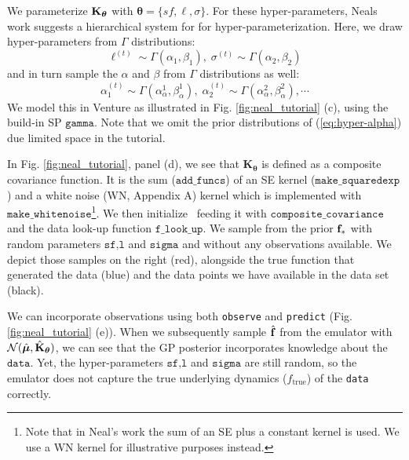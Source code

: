 We parameterize $\mathbf{K}_{\bm{\theta}}$ with $\bm{\theta}=\{sf,\ell,\sigma\}$.
For these hyper-parameters, Neals work suggests a hierarchical system for
for hyper-parameterization.
Here, we draw hyper-parameters from $\Gamma$ distributions:
\begin{equation}
\label{eq:hyper-ell}
\ell^{(t)} \sim \Gamma(\alpha_1,\beta_1),\;\sigma^{(t)} \sim \Gamma(\alpha_2,\beta_2)
\end{equation} 
and in turn sample the $\alpha$ and $\beta$ from $\Gamma$ distributions as well:
\begin{equation}
\label{eq:hyper-alpha}
\alpha_1^{(t)} \sim \Gamma(\alpha^1_{\alpha},\beta^1_{ \alpha } ),\; \alpha_2^{(t)} \sim \Gamma(\alpha^2_{\alpha},\beta^2_{\alpha}),\cdots
\end{equation}
We model this in Venture as illustrated in Fig. \ref{fig:neal_tutorial} (c),
using the build-in \ac{SP} $\texttt{gamma}$. Note that we omit the prior distributions of (\ref{eq:hyper-alpha}) due limited space in the tutorial.

In Fig. \ref{fig:neal_tutorial}, panel (d), we see that $\mathbf{K}_{\bm{\theta}}$
is defined as a composite covariance function. It is the sum ($\texttt{add\_funcs}$) of
an SE kernel ($\texttt{make\_squaredexp}$) and a white noise (WN, Appendix A)
kernel which is implemented with $\texttt{make\_whitenoise}$\footnote{Note
that in Neal's work \citeyearpar{neal1997monte} the sum of an SE
plus a constant kernel is used. We use a WN kernel for illustrative purposes
instead.}. 
We then initialize \gpmem\ feeding it with $\texttt{composite\_covariance}$ and the data
look-up function $\texttt{f\_look\_up}$. 
We sample from the prior $\mathbf{f}_*$ with random parameters $\texttt{sf,l}$ and $\texttt{sigma}$ and 
without any observations available.
We depict those samples on the right (red), alongside the true function that generated the data (blue) and
the data points we have available in the data set (black).

We can incorporate observations using both \texttt{observe} and \texttt{predict} (Fig. \ref{fig:neal_tutorial} (e)).
When we subsequently sample $\hat{\mathbf{f}}$ from the emulator with
$\mathcal{N}(\hat{\bm{\mu}},\hat{\mathbf{K}}_{\bm{\theta}})$, we can see that the \ac{GP} posterior incorporates knowledge 
about the $\texttt{data}$. Yet, the hyper-parameters $\texttt{sf,l}$ and $\texttt{sigma}$ are still
random, so the emulator does not capture the true underlying dynamics
($f_\text{true}$) of the \texttt{data} correctly. 

